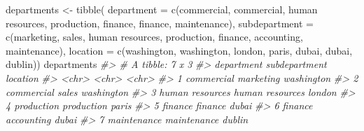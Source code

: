 \documentclass[
]{book}
\newenvironment{Shaded}{\begin{snugshade}}{\end{snugshade}}
\newcommand{\AttributeTok}[1]{\textcolor[rgb]{0.77,0.63,0.00}{#1}}
\newcommand{\CommentTok}[1]{\textcolor[rgb]{0.56,0.35,0.01}{\textit{#1}}}
\newcommand{\FunctionTok}[1]{\textcolor[rgb]{0.00,0.00,0.00}{#1}}
\newcommand{\NormalTok}[1]{#1}
\newcommand{\OtherTok}[1]{\textcolor[rgb]{0.56,0.35,0.01}{#1}}
\newcommand{\StringTok}[1]{\textcolor[rgb]{0.31,0.60,0.02}{#1}}
\begin{document}
\begin{Shaded}
\begin{Highlighting}[]
\NormalTok{departments }\OtherTok{\textless{}{-}} \FunctionTok{tibble}\NormalTok{(}
    \AttributeTok{department =} \FunctionTok{c}\NormalTok{(}\StringTok{\textquotesingle{}commercial\textquotesingle{}}\NormalTok{, }\StringTok{\textquotesingle{}commercial\textquotesingle{}}\NormalTok{, }\StringTok{\textquotesingle{}human resources\textquotesingle{}}\NormalTok{, }\StringTok{\textquotesingle{}production\textquotesingle{}}\NormalTok{, }
                   \StringTok{\textquotesingle{}finance\textquotesingle{}}\NormalTok{, }\StringTok{\textquotesingle{}finance\textquotesingle{}}\NormalTok{, }\StringTok{\textquotesingle{}maintenance\textquotesingle{}}\NormalTok{),}
    \AttributeTok{subdepartment =} \FunctionTok{c}\NormalTok{(}\StringTok{\textquotesingle{}marketing\textquotesingle{}}\NormalTok{, }\StringTok{\textquotesingle{}sales\textquotesingle{}}\NormalTok{, }\StringTok{\textquotesingle{}human resources\textquotesingle{}}\NormalTok{, }\StringTok{\textquotesingle{}production\textquotesingle{}}\NormalTok{, }\StringTok{\textquotesingle{}finance\textquotesingle{}}\NormalTok{, }
                      \StringTok{\textquotesingle{}accounting\textquotesingle{}}\NormalTok{, }\StringTok{\textquotesingle{}maintenance\textquotesingle{}}\NormalTok{),}
    \AttributeTok{location =} \FunctionTok{c}\NormalTok{(}\StringTok{\textquotesingle{}washington\textquotesingle{}}\NormalTok{, }\StringTok{\textquotesingle{}washington\textquotesingle{}}\NormalTok{, }\StringTok{\textquotesingle{}london\textquotesingle{}}\NormalTok{, }\StringTok{\textquotesingle{}paris\textquotesingle{}}\NormalTok{, }\StringTok{\textquotesingle{}dubai\textquotesingle{}}\NormalTok{, }\StringTok{\textquotesingle{}dubai\textquotesingle{}}\NormalTok{, }\StringTok{\textquotesingle{}dublin\textquotesingle{}}\NormalTok{))}
\NormalTok{departments}
\CommentTok{\#\textgreater{} \# A tibble: 7 x 3}
\CommentTok{\#\textgreater{}   department      subdepartment   location  }
\CommentTok{\#\textgreater{}   \textless{}chr\textgreater{}           \textless{}chr\textgreater{}           \textless{}chr\textgreater{}     }
\CommentTok{\#\textgreater{} 1 commercial      marketing       washington}
\CommentTok{\#\textgreater{} 2 commercial      sales           washington}
\CommentTok{\#\textgreater{} 3 human resources human resources london    }
\CommentTok{\#\textgreater{} 4 production      production      paris     }
\CommentTok{\#\textgreater{} 5 finance         finance         dubai     }
\CommentTok{\#\textgreater{} 6 finance         accounting      dubai     }
\CommentTok{\#\textgreater{} 7 maintenance     maintenance     dublin}


\end{Highlighting}
\end{Shaded}
\end{document}
